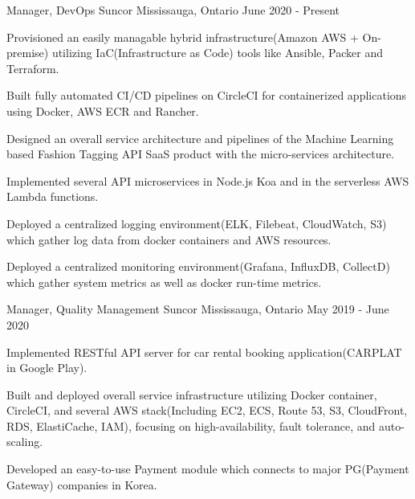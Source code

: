

\begin{cventries}

  \cventry
    {Manager, DevOps} %
    {Suncor} %
    {Mississauga, Ontario} %
    {June 2020 - Present} %
    {
      \begin{cvitems} %
        \item {Provisioned an easily managable hybrid infrastructure(Amazon AWS + On-premise) utilizing IaC(Infrastructure as Code) tools like Ansible, Packer and Terraform.}
        \item {Built fully automated CI/CD pipelines on CircleCI for containerized applications using Docker, AWS ECR and Rancher.}
        \item {Designed an overall service architecture and pipelines of the Machine Learning based Fashion Tagging API SaaS product with the micro-services architecture.}
        \item {Implemented several API microservices in Node.js Koa and in the serverless AWS Lambda functions.}
        \item {Deployed a centralized logging environment(ELK, Filebeat, CloudWatch, S3) which gather log data from docker containers and AWS resources.}
        \item {Deployed a centralized monitoring environment(Grafana, InfluxDB, CollectD) which gather system metrics as well as docker run-time metrics.}
      \end{cvitems}
    }

  \cventry
    {Manager, Quality Management} %
    {Suncor} %
    {Mississauga, Ontario} %
    {May 2019 - June 2020} %
    {
      \begin{cvitems} %
        \item {Implemented RESTful API server for car rental booking application(CARPLAT in Google Play).}
        \item {Built and deployed overall service infrastructure utilizing Docker container, CircleCI, and several AWS stack(Including EC2, ECS, Route 53, S3, CloudFront, RDS, ElastiCache, IAM), focusing on high-availability, fault tolerance, and auto-scaling.}
        \item {Developed an easy-to-use Payment module which connects to major PG(Payment Gateway) companies in Korea.}
      \end{cvitems}
    }


\end{cventries}

